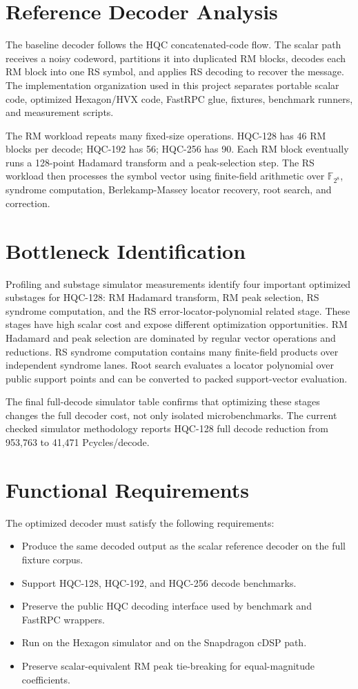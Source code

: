 \documentclass[12pt,a4paper]{report}
\newcommand{\gf}{\mathbb{F}_{2^8}}
\begin{document}
\section{Reference Decoder Analysis}
The baseline decoder follows the HQC concatenated-code flow. The scalar path receives a noisy codeword, partitions it into duplicated RM blocks, decodes each RM block into one RS symbol, and applies RS decoding to recover the message. The implementation organization used in this project separates portable scalar code, optimized Hexagon/HVX code, FastRPC glue, fixtures, benchmark runners, and measurement scripts.

The RM workload repeats many fixed-size operations. HQC-128 has 46 RM blocks per decode; HQC-192 has 56; HQC-256 has 90. Each RM block eventually runs a 128-point Hadamard transform and a peak-selection step. The RS workload then processes the symbol vector using finite-field arithmetic over \(\gf\), syndrome computation, Berlekamp-Massey locator recovery, root search, and correction.

\section{Bottleneck Identification}
Profiling and substage simulator measurements identify four important optimized substages for HQC-128: RM Hadamard transform, RM peak selection, RS syndrome computation, and the RS error-locator-polynomial related stage. These stages have high scalar cost and expose different optimization opportunities. RM Hadamard and peak selection are dominated by regular vector operations and reductions. RS syndrome computation contains many finite-field products over independent syndrome lanes. Root search evaluates a locator polynomial over public support points and can be converted to packed support-vector evaluation.

The final full-decode simulator table confirms that optimizing these stages changes the full decoder cost, not only isolated microbenchmarks. The current checked simulator methodology reports HQC-128 full decode reduction from 953,763 to 41,471 Pcycles/decode.

\section{Functional Requirements}
The optimized decoder must satisfy the following requirements:
\begin{itemize}
  \item Produce the same decoded output as the scalar reference decoder on the full fixture corpus.
  \item Support HQC-128, HQC-192, and HQC-256 decode benchmarks.
  \item Preserve the public HQC decoding interface used by benchmark and FastRPC wrappers.
  \item Run on the Hexagon simulator and on the Snapdragon cDSP path.
  \item Preserve scalar-equivalent RM peak tie-breaking for equal-magnitude coefficients.
\end{itemize}
\end{document}
